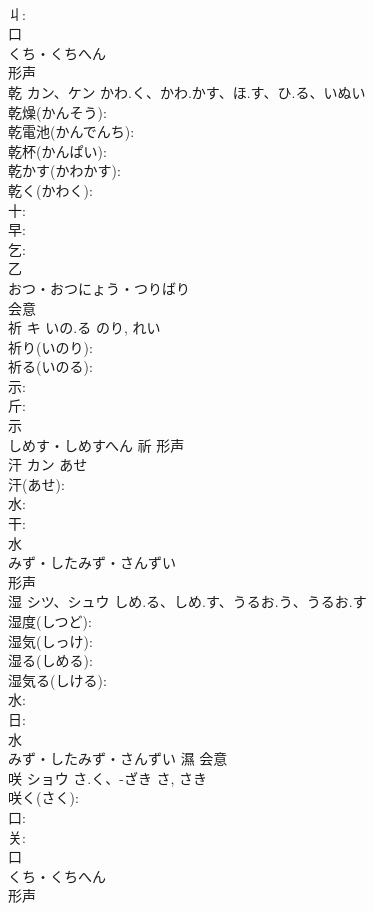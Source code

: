 \documentclass[8pt]{extreport}
\begin{document}
\begin{CJK}{UTF8}{min}
\\	丩: 
\\	口	
\\	くち・くちへん	
\\	形声 
\\	乾	カン、ケン	かわ.く、かわ.かす、ほ.す、ひ.る、いぬい		
\\	乾燥(かんそう): 
\\	乾電池(かんでんち): 
\\	乾杯(かんぱい): 
\\	乾かす(かわかす): 
\\	乾く(かわく): 
\\	十: 
\\	早: 
\\	乞: 
\\	乙	
\\	おつ・おつにょう・つりばり	
\\	会意 
\\	祈	キ	いの.る	のり, れい	
\\	祈り(いのり): 
\\	祈る(いのる): 
\\	示: 
\\	斤: 
\\	示	
\\	しめす・しめすへん	祈	形声 
\\	汗	カン	あせ		
\\	汗(あせ): 
\\	水: 
\\	干: 
\\	水	
\\	みず・したみず・さんずい	
\\	形声 
\\	湿	シツ、シュウ	しめ.る、しめ.す、うるお.う、うるお.す		
\\	湿度(しつど): 
\\	湿気(しっけ): 
\\	湿る(しめる): 
\\	湿気る(しける): 
\\	水: 
\\	日: 
\\	水	
\\	みず・したみず・さんずい	濕	会意 
\\	咲	ショウ	さ.く、-ざき	さ, さき	
\\	咲く(さく): 
\\	口: 
\\	关: 
\\	口	
\\	くち・くちへん	
\\	形声 

\end{CJK}
\end{document}
